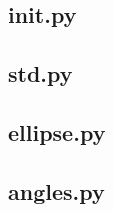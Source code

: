 \documentclass[withoutpreface,bwprint]{cumcmthesis} %
\begin{document}
  \subsection{init.py}
    

    \subsection{std.py}
    

    \subsection{ellipse.py}
    

    \subsection{angles.py}
    
\end{document}
